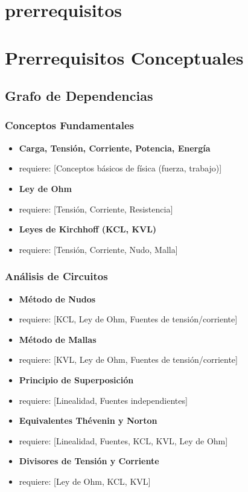 \documentclass[11pt,a4paper]{article}
\begin{document}
\section*{prerrequisitos}

\section*{Prerrequisitos Conceptuales}


\subsection*{Grafo de Dependencias}


\subsubsection*{Conceptos Fundamentales}


\begin{itemize}[leftmargin=*,topsep=2pt,itemsep=1pt]
  \item \textbf{Carga, Tensión, Corriente, Potencia, Energía}
  \item requiere: [Conceptos básicos de física (fuerza, trabajo)]
  \item \textbf{Ley de Ohm}
  \item requiere: [Tensión, Corriente, Resistencia]
  \item \textbf{Leyes de Kirchhoff (KCL, KVL)}
  \item requiere: [Tensión, Corriente, Nudo, Malla]
\end{itemize}


\subsubsection*{Análisis de Circuitos}


\begin{itemize}[leftmargin=*,topsep=2pt,itemsep=1pt]
  \item \textbf{Método de Nudos}
  \item requiere: [KCL, Ley de Ohm, Fuentes de tensión/corriente]
  \item \textbf{Método de Mallas}
  \item requiere: [KVL, Ley de Ohm, Fuentes de tensión/corriente]
  \item \textbf{Principio de Superposición}
  \item requiere: [Linealidad, Fuentes independientes]
  \item \textbf{Equivalentes Thévenin y Norton}
  \item requiere: [Linealidad, Fuentes, KCL, KVL, Ley de Ohm]
  \item \textbf{Divisores de Tensión y Corriente}
  \item requiere: [Ley de Ohm, KCL, KVL]
\end{itemize}
\end{document}
